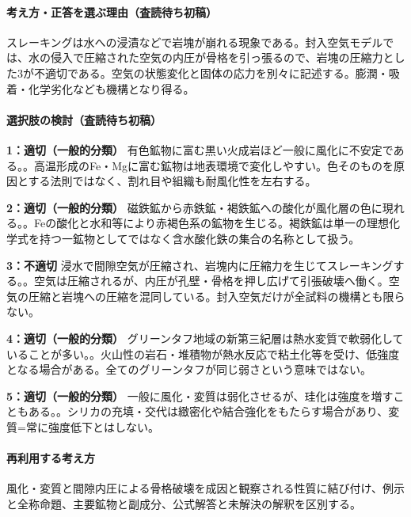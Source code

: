 \paragraph{考え方・正答を選ぶ理由（査読待ち初稿）} スレーキングは水への浸漬などで岩塊が崩れる現象である。封入空気モデルでは、水の侵入で圧縮された空気の内圧が骨格を引っ張るので、岩塊の圧縮力とした3が不適切である。空気の状態変化と固体の応力を別々に記述する。膨潤・吸着・化学劣化なども機構となり得る。

\paragraph{選択肢の検討（査読待ち初稿）}\mbox{}\par

\noindent\textbf{1：適切（一般的分類）} 有色鉱物に富む黒い火成岩ほど一般に風化に不安定である。。高温形成のFe・Mgに富む鉱物は地表環境で変化しやすい。色そのものを原因とする法則ではなく、割れ目や組織も耐風化性を左右する。\par

\noindent\textbf{2：適切（一般的分類）} 磁鉄鉱から赤鉄鉱・褐鉄鉱への酸化が風化層の色に現れる。。Feの酸化と水和等により赤褐色系の鉱物を生じる。褐鉄鉱は単一の理想化学式を持つ一鉱物としてではなく含水酸化鉄の集合の名称として扱う。\par

\noindent\textbf{3：不適切} 浸水で間隙空気が圧縮され、岩塊内に圧縮力を生じてスレーキングする。。空気は圧縮されるが、内圧が孔壁・骨格を押し広げて引張破壊へ働く。空気の圧縮と岩塊への圧縮を混同している。封入空気だけが全試料の機構とも限らない。\par

\noindent\textbf{4：適切（一般的分類）} グリーンタフ地域の新第三紀層は熱水変質で軟弱化していることが多い。。火山性の岩石・堆積物が熱水反応で粘土化等を受け、低強度となる場合がある。全てのグリーンタフが同じ弱さという意味ではない。\par

\noindent\textbf{5：適切（一般的分類）} 一般に風化・変質は弱化させるが、珪化は強度を増すこともある。。シリカの充填・交代は緻密化や結合強化をもたらす場合があり、変質=常に強度低下とはしない。\par

\paragraph{再利用する考え方} 風化・変質と間隙内圧による骨格破壊を成因と観察される性質に結び付け、例示と全称命題、主要鉱物と副成分、公式解答と未解決の解釈を区別する。

